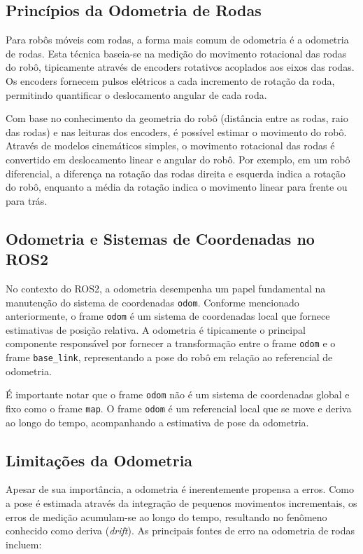 \subsection{Princípios da Odometria de Rodas}

Para robôs móveis com rodas, a forma mais comum de odometria é a odometria de
rodas. Esta técnica baseia-se na medição do movimento rotacional das rodas do
robô, tipicamente através de encoders rotativos acoplados aos eixos das rodas.
Os encoders fornecem pulsos elétricos a cada incremento de rotação da roda,
permitindo quantificar o deslocamento angular de cada roda.

Com base no conhecimento da geometria do robô (distância entre as rodas, raio
das rodas) e nas leituras dos encoders, é possível estimar o movimento do robô.
Através de modelos cinemáticos simples, o movimento rotacional das rodas é
convertido em deslocamento linear e angular do robô. Por exemplo, em um robô
diferencial, a diferença na rotação das rodas direita e esquerda indica a
rotação do robô, enquanto a média da rotação indica o movimento linear para
frente ou para trás.

\subsection{Odometria e Sistemas de Coordenadas no ROS2}

No contexto do ROS2, a odometria desempenha um papel fundamental na manutenção
do sistema de coordenadas \texttt{odom}. Conforme mencionado anteriormente, o
frame \texttt{odom} é um sistema de coordenadas local que fornece estimativas
de posição relativa. A odometria é tipicamente o principal componente
responsável por fornecer a transformação entre o frame \texttt{odom} e o frame
\texttt{base\_link}, representando a pose do robô em relação ao referencial de
odometria.

É importante notar que o frame \texttt{odom} não é um sistema de coordenadas global e fixo como o frame \texttt{map}. O frame \texttt{odom} é um referencial local que se move e deriva ao longo do tempo, acompanhando a estimativa de pose da odometria.

\subsection{Limitações da Odometria}

Apesar de sua importância, a odometria é inerentemente propensa a erros. Como a
pose é estimada através da integração de pequenos movimentos incrementais, os
erros de medição acumulam-se ao longo do tempo, resultando no fenômeno
conhecido como deriva (\textit{drift}). As principais fontes de erro na
odometria de rodas incluem:

